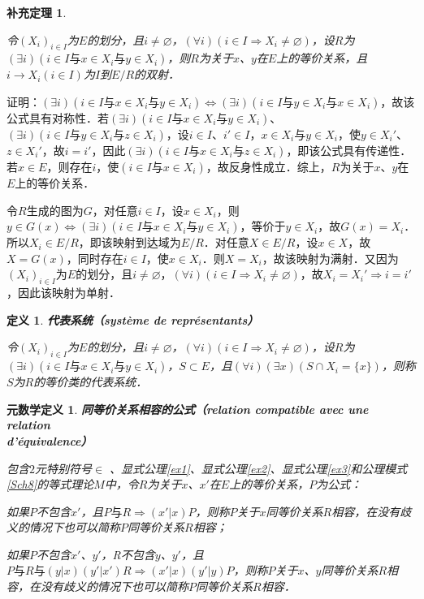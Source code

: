 \documentclass[12pt, a4paper, oneside]{book}
\newtheorem{metadef}{元数学定义}
\newtheorem{cor}{补充定理}
\newtheorem{de}{定义}
\begin{document}
			\begin{cor}\label{cor148}
				\hfill\par
				令$(X_i)_{i\in I}$为$E$的划分，且$i\neq \varnothing$，$(\forall i)(i\in I\Rightarrow X_i\neq \varnothing)$，设$R$为$(\exists i)(i\in I\text{与}x\in X_i\text{与}y\in X_i)$，则$R$为关于$x$、$y$在$E$上的等价关系，且$i\to X_i(i\in I)$为$I$到$E/R$的双射．
			\end{cor}
			证明：$(\exists i)(i\in I\text{与}x\in X_i\text{与}y\in X_i)\Leftrightarrow (\exists i)(i\in I\text{与}y\in X_i\text{与}x\in X_i)$，故该公式具有对称性．若$(\exists i)(i\in I\text{与}x\in X_i\text{与}y\in X_i)$、$(\exists i)(i\in I\text{与}y\in X_i\text{与}z\in X_i)$，设$i\in I$、$i'\in I$，$x\in X_i\text{与}y\in X_i$，使$y\in X_i'$、$z\in X_i'$，故$i=i'$，因此$(\exists i)(i\in I\text{与}x\in X_i\text{与}z\in X_i)$，即该公式具有传递性．若$x\in E$，则存在$i$，使$(i\in I\text{与}x\in X_i)$，故反身性成立．综上，$R$为关于$x$、$y$在$E$上的等价关系．
			\par
			令$R$生成的图为$G$，对任意$i\in I$，设$x\in X_i$，则$y\in G(x)\Leftrightarrow (\exists i)(i\in I\text{与}x\in X_i\text{与}y\in X_i)$，等价于$y\in X_i$，故$G(x)=X_i$．所以$X_i\in E/R$，即该映射到达域为$E/R$．对任意$X\in E/R$，设$x\in X$，故$X=G(x)$，同时存在$i\in I$，使$x\in X_i$．则$X=X_i$，故该映射为满射．又因为$(X_i)_{i\in I}$为$E$的划分，且$i\neq \varnothing$，$(\forall i)(i\in I\Rightarrow X_i\neq \varnothing)$，故$X_i=X_i'\Rightarrow i=i'$，因此该映射为单射．
			
			\begin{de}
				\textbf{代表系统（système de représentants）}
				\par
				令$(X_i)_{i\in I}$为$E$的划分，且$i\neq \varnothing$，$(\forall i)(i\in I\Rightarrow X_i\neq \varnothing)$，设$R$为$(\exists i)(i\in I\text{与}x\in X_i\text{与}y\in X_i)$，$S\subset E$，且$(\forall i)(\exists x)(S\cap X_i=\{x\})$，则称$S$为$R$的等价类的代表系统．
			\end{de}

			\begin{metadef}
				\textbf{同等价关系相容的公式（relation compatible avec une relation \\d'équivalence）}
				\par
				包含$2$元特别符号$\in$ 、显式公理\ref{ex1}、显式公理\ref{ex2}、显式公理\ref{ex3}和公理模式\ref{Sch8}的等式理论$M$中，令$R$为关于$x$、$x'$在$E$上的等价关系，$P$为公式：
				\par
				如果$P$不包含$x'$，且$P\text{与}R\Rightarrow (x'|x)P$，则称$P$关于$x$同等价关系$R$相容，在没有歧义的情况下也可以简称$P$同等价关系$R$相容；
				\par
				如果$P$不包含$x'$、$y'$，R不包含$y$、$y'$，且$P\text{与}R\text{与}(y|x)(y'|x')R\Rightarrow (x'|x)(y'|y)P$，则称$P$关于$x$、$y$同等价关系$R$相容，在没有歧义的情况下也可以简称$P$同等价关系$R$相容．
			\end{metadef}	
\end{document}
